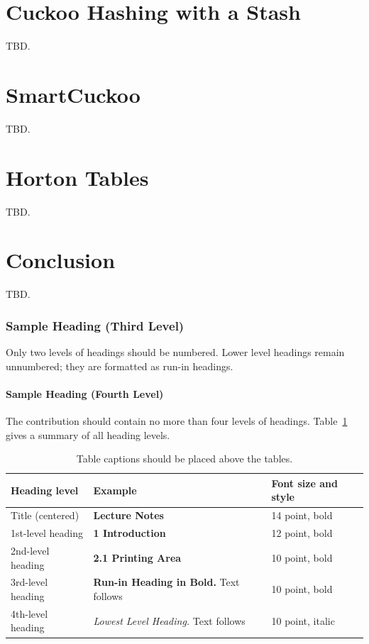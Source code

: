 \documentclass[runningheads]{llncs}
\begin{document}
\section{Cuckoo Hashing with a Stash}
\label{sec:chs}
TBD.
\section{SmartCuckoo}
\label{sec:smart}
TBD.
\section{Horton Tables}
\label{sec:horton}
TBD.
\section{Conclusion}
\label{sec:conclude}
TBD.

\subsubsection{Sample Heading (Third Level)} Only two levels of
headings should be numbered. Lower level headings remain unnumbered;
they are formatted as run-in headings.

\paragraph{Sample Heading (Fourth Level)}
The contribution should contain no more than four levels of
headings. Table~\ref{tab1} gives a summary of all heading levels.

\begin{table}
\caption{Table captions should be placed above the
tables.}\label{tab1}
\begin{tabular}{|l|l|l|}
\hline
Heading level &  Example & Font size and style\\
\hline
Title (centered) &  {\Large\bfseries Lecture Notes} & 14 point, bold\\
1st-level heading &  {\large\bfseries 1 Introduction} & 12 point, bold\\
2nd-level heading & {\bfseries 2.1 Printing Area} & 10 point, bold\\
3rd-level heading & {\bfseries Run-in Heading in Bold.} Text follows & 10 point, bold\\
4th-level heading & {\itshape Lowest Level Heading.} Text follows & 10 point, italic\\
\hline
\end{tabular}
\end{table}
\end{document}
